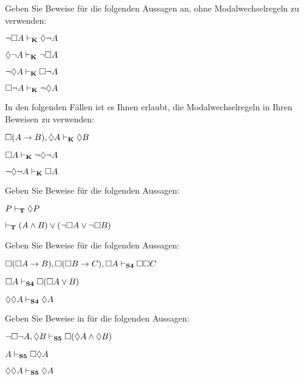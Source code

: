 \problempart
Geben Sie Beweise für die folgenden Aussagen an, ohne Modalwechselregeln zu verwenden:
\begin{earg}
	\item $\neg\Box A\vdash_{\mathbf{K}} \Diamond \neg A$
	\item $\Diamond\neg A\vdash_{\mathbf{K}}\neg \Box A$
	\item $\neg\Diamond A\vdash_{\mathbf{K}}\Box\neg A$
	\item $\Box\neg A\vdash_{\mathbf{K}}\neg\Diamond A$
\end{earg}

\problempart
In den folgenden Fällen ist es Ihnen erlaubt, die Modalwechselregeln in Ihren Beweisen zu verwenden:
\begin{earg}
	\item $\Box(A\rightarrow B), \Diamond A \vdash_{\mathbf{K}} \Diamond B$
	\item $\Box A \vdash_{\mathbf{K}} \neg\Diamond\neg A$
	\item $\neg\Diamond\neg A \vdash_{\mathbf{K}} \Box A$
\end{earg}

\problempart
Geben Sie Beweise für die folgenden Aussagen:
\begin{earg}
	\item $P\vdash_{\mathbf{T}}\Diamond P$
	\item $\vdash_{\mathbf{T}} (A\wedge B)\vee(\neg \Box A\vee\neg\Box B)$
\end{earg}

\problempart
Geben Sie Beweise für die folgenden Aussagen:
\begin{earg}
	\item $\Box(\Box A\rightarrow B), \Box (\Box B\rightarrow C), \Box A \vdash_{\mathbf{S4}} \Box\Box C$
	\item $\Box A \vdash_{\mathbf{S4}} \Box(\Box A \vee B)$
	\item $\Diamond \Diamond A \vdash_{\mathbf{S4}} \Diamond A$
\end{earg}


\problempart
Geben Sie Beweise in \mlSfive{} für die folgenden Aussagen:
\begin{earg}
	\item $\neg\Box\neg A, \Diamond B\vdash_{\mathbf{S5}} \Box(\Diamond A \wedge \Diamond B)$
	\item $A \vdash_{\mathbf{S5}}  \Box\Diamond A$
	\item $\Diamond\Diamond A\vdash_{\mathbf{S5}}  \Diamond A$
\end{earg}


